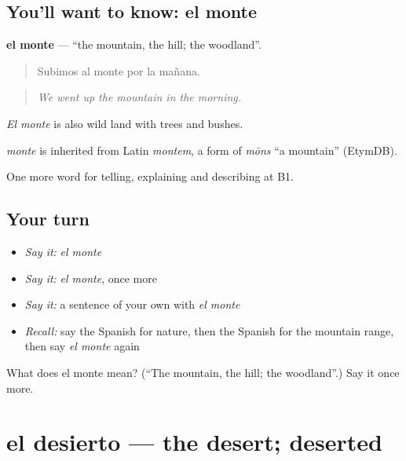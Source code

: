 \subsection*{You'll want to know: el monte}
\textbf{el monte} — \textquotedblleft{}the mountain, the hill; the woodland\textquotedblright{}.

\begin{quote}
Subimos al monte por la mañana.
\end{quote}

\begin{quote}
\emph{We went up the mountain in the morning.}
\end{quote}

\emph{El monte} is also wild land with trees and bushes.

\begin{cousinweb}
\emph{monte} is inherited from Latin \emph{montem}, a form of \emph{mōns} \textquotedblleft{}a mountain\textquotedblright{} (EtymDB).
\end{cousinweb}

\begin{grammarlens}[title={What you've built}]
One more word for telling, explaining and describing at B1.
\end{grammarlens}

\subsection*{Your turn}
\begin{itemize}
\raggedright
  \item \emph{Say it:} \emph{el monte}
  \item \emph{Say it:} \emph{el monte}, once more
  \item \emph{Say it:} a sentence of your own with \emph{el monte}
  \item \emph{Recall:} say the Spanish for nature, then the Spanish for the mountain range, then say \emph{el monte} again
\end{itemize}

\begin{tcolorbox}[breakable,colback=teal!4,colframe=teal!35!black,title={Before you move on}]
What does el monte mean? (\textquotedblleft{}The mountain, the hill; the woodland\textquotedblright{}.) Say it once more.
\end{tcolorbox}
\section[el desierto]{el desierto — the desert; deserted}


